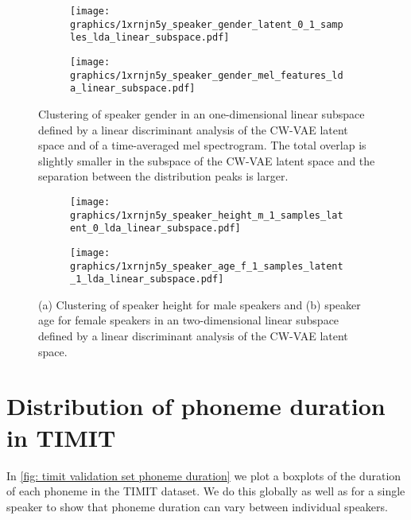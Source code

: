 {\begin{figure}[t!]
     \centering
     \hfill
     \begin{subfigure}[b]{0.48\textwidth}
         \centering
         \texttt{[image: graphics/1xrnjn5y\_speaker\_gender\_latent\_0\_1\_samples\_lda\_linear\_subspace.pdf]}
         \caption{}
         \label{fig: latent space gender}
     \end{subfigure}
     \hfill
     \begin{subfigure}[b]{0.48\textwidth}
         \centering
         \texttt{[image: graphics/1xrnjn5y\_speaker\_gender\_mel\_features\_lda\_linear\_subspace.pdf]}
         \caption{}
         \label{fig: mel features gender}
     \end{subfigure}
    \caption{Clustering of speaker gender in an one-dimensional linear subspace defined by a linear discriminant analysis of the CW-VAE latent space and of a time-averaged mel spectrogram. The total overlap is slightly smaller in the subspace of the CW-VAE latent space and the separation between the distribution peaks is larger.}
    \label{fig: latent space visualization gender}
\end{figure}


\begin{figure}[t!]
     \centering
     \hfill
     \begin{subfigure}[b]{0.48\textwidth}
         \centering
         \texttt{[image: graphics/1xrnjn5y\_speaker\_height\_m\_1\_samples\_latent\_0\_lda\_linear\_subspace.pdf]}
         \caption{}
         \label{fig: cwvae latent z1 height}
     \end{subfigure}
     \hfill
     \begin{subfigure}[b]{0.48\textwidth}
         \centering
         \texttt{[image: graphics/1xrnjn5y\_speaker\_age\_f\_1\_samples\_latent\_1\_lda\_linear\_subspace.pdf]}
         \caption{}
         \label{fig: cwvae latent z0 age}
     \end{subfigure}
    \caption{(a) Clustering of speaker height for male speakers and (b) speaker age for female speakers in an two-dimensional linear subspace defined by a linear discriminant analysis of the CW-VAE latent space.}
    \label{fig: cwvae latent height}
\end{figure}




\section{Distribution of phoneme duration in TIMIT}\label{app: timit phoneme distributions}
In \cref{fig: timit validation set phoneme duration} we plot a boxplots of the duration of each phoneme in the TIMIT dataset. We do this globally as well as for a single speaker to show that phoneme duration can vary between individual speakers. 

}

